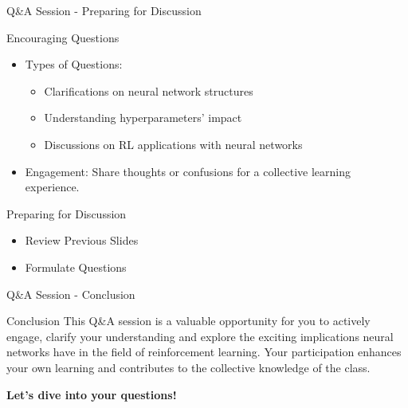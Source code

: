 \documentclass[aspectratio=169]{beamer}
\begin{document}
\begin{frame}[fragile]{Q\&A Session - Preparing for Discussion}
    \begin{block}{Encouraging Questions}
        \begin{itemize}
            \item Types of Questions:
                \begin{itemize}
                    \item Clarifications on neural network structures
                    \item Understanding hyperparameters' impact 
                    \item Discussions on RL applications with neural networks
                \end{itemize}
            \item Engagement: Share thoughts or confusions for a collective learning experience.
        \end{itemize}
    \end{block}
  
    \begin{block}{Preparing for Discussion}
        \begin{itemize}
            \item Review Previous Slides
            \item Formulate Questions
        \end{itemize}
    \end{block}
\end{frame}

\begin{frame}[fragile]{Q\&A Session - Conclusion}
    \begin{block}{Conclusion}
        This Q\&A session is a valuable opportunity for you to actively engage, clarify your understanding and explore the exciting implications neural networks have in the field of reinforcement learning. Your participation enhances your own learning and contributes to the collective knowledge of the class.
    \end{block}
    \begin{center}
        \textbf{Let’s dive into your questions!}
    \end{center}
\end{frame}
\end{document}

